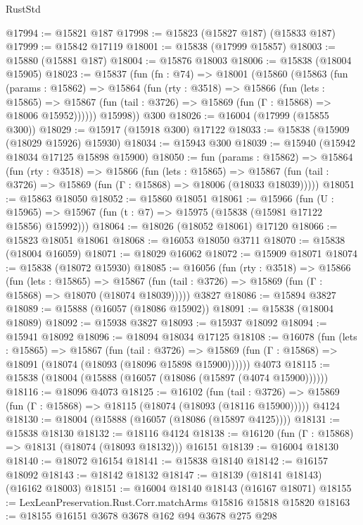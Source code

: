 \begin{lexlean}{RustStd}
\begin{coremodule}
@17994 := @15821 @187
@17998 := @15823 (@15827 @187) (@15833 @187)
@17999 := @15842 @17119
@18001 := @15838 (@17999 @15857)
@18003 := @15880 (@15881 @187)
@18004 := @15876 @18003
@18006 := @15838 (@18004 @15905)
@18023 := @15837
    (fun (fn : @74) =>
    @18001
      (@15860
        (@15863
          (fun (params : @15862) =>
          @15864
            (fun (rty : @3518) =>
            @15866
              (fun (lets : @15865) =>
              @15867 (fun (tail : @3726) => @15869 (fun (Γ : @15868) => @18006 @15952))))))
        @15998))
    @300
@18026 := @16004 (@17999 (@15855 @300))
@18029 := @15917 (@15918 @300) @17122
@18033 := @15838 (@15909 (@18029 @15926) @15930)
@18034 := @15943 @300
@18039 := @15940 (@15942 @18034 @17125 @15898 @15900)
@18050 := fun (params : @15862) =>
  @15864
    (fun (rty : @3518) =>
    @15866
      (fun (lets : @15865) =>
      @15867 (fun (tail : @3726) => @15869 (fun (Γ : @15868) => @18006 (@18033 @18039)))))
@18051 := @15863 @18050
@18052 := @15860 @18051
@18061 := @15966
    (fun (U : @15965) => @15967 (fun (t : @7) => @15975 (@15838 (@15981 @17122 @15856) @15992)))
@18064 := @18026 (@18052 @18061) @17120
@18066 := @15823 @18051 @18061
@18068 := @16053 @18050 @3711
@18070 := @15838 (@18004 @16059)
@18071 := @18029 @16062
@18072 := @15909 @18071
@18074 := @15838 (@18072 @15930)
@18085 := @16056
    (fun (rty : @3518) =>
    @15866
      (fun (lets : @15865) =>
      @15867 (fun (tail : @3726) => @15869 (fun (Γ : @15868) => @18070 (@18074 @18039)))))
    @3827
@18086 := @15894 @3827
@18089 := @15888 (@16057 (@18086 @15902))
@18091 := @15838 (@18004 @18089)
@18092 := @15938 @3827
@18093 := @15937 @18092
@18094 := @15941 @18092
@18096 := @18094 @18034 @17125
@18108 := @16078
    (fun (lets : @15865) =>
    @15867
      (fun (tail : @3726) =>
      @15869 (fun (Γ : @15868) => @18091 (@18074 (@18093 (@18096 @15898 @15900))))))
    @4073
@18115 := @15838 (@18004 (@15888 (@16057 (@18086 (@15897 (@4074 @15900))))))
@18116 := @18096 @4073
@18125 := @16102
    (fun (tail : @3726) => @15869 (fun (Γ : @15868) => @18115 (@18074 (@18093 (@18116 @15900)))))
    @4124
@18130 := @18004 (@15888 (@16057 (@18086 (@15897 @4125))))
@18131 := @15838 @18130
@18132 := @18116 @4124
@18138 := @16120 (fun (Γ : @15868) => @18131 (@18074 (@18093 @18132))) @16151
@18139 := @16004 @18130
@18140 := @18072 @16154
@18141 := @15838 @18140
@18142 := @16157 @18092
@18143 := @18142 @18132
@18147 := @18139 (@18141 @18143) (@16162 @18003)
@18151 := @16004 @18140 @18143 (@16167 @18071)
@18155 := LexLeanPreservation.Rust.Corr.matchArms @15816 @15818 @15820
@18163 := @18155 @16151 @3678 @3678 @162 @94 @3678 @275 @298

\end{coremodule}
\end{lexlean}

